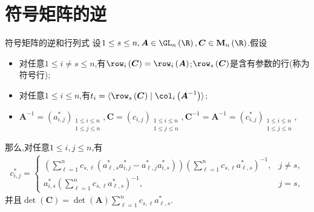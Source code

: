 \section{符号矩阵的逆}

\begin{theorem}{符号矩阵的逆和行列式}{}
	设$1\leq s\leq n,\boldsymbol{A}\in\GL_{n}\left(\R\right),\boldsymbol{C}\in\mathbf{M}_{n}\left(\R\right)$.假设
	\begin{itemize}
		\item 对任意$1\leq i\neq s\leq n$,有$\row_{i}\left(\boldsymbol{C}\right)=\row_{i}\left(\boldsymbol{A}\right)$;$\row_{s}\left(\boldsymbol{C}\right)$是含有参数的行(称为符号行);
		\item 对任意$1\leq i\leq n$,有$t_{i}=\langle\row_{s}\left(\boldsymbol{C}\right)\mid\col_{i}\left(\boldsymbol{A}^{-1}\right)\rangle$;
		\item $\boldsymbol{A}^{-1}=\left(a_{i,j}^{\ast}\right)_{\substack{1\leq i\leq n\\1\leq j\leq n}},\boldsymbol{C}=\left(c_{i,j}\right)_{\substack{1\leq i\leq n\\1\leq j\leq n}},\boldsymbol{C}^{-1}=\boldsymbol{A}^{-1}=\left(c_{i,j}^{\ast}\right)_{\substack{1\leq i\leq n\\1\leq j\leq n}}$,
	\end{itemize}
	那么,对任意$1\leq i,j\leq n$,有
	\begin{align*}
		c_{i,j}^{\ast}=
		\begin{cases}
			\left(\sum\limits_{\ell=1}^{n}c_{s,\ell}\left(a_{\ell,s}^{\ast}a_{i,j}^{\ast}-a_{\ell,j}^{\ast}a_{i,s}^{\ast}\right)\right)\left(\sum\limits_{\ell=1}^{n}c_{s,\ell}a_{\ell,s}^{\ast}\right)^{-1},&j\neq s,\\
			a_{i,s}^{\ast}\left(\sum\limits_{\ell=1}^{n}c_{s,\ell}a_{\ell,s}^{\ast}\right)^{-1},&j=s,
		\end{cases}
	\end{align*}
	并且$\det\left(\boldsymbol{C}\right)=\det\left(\boldsymbol{A}\right)\sum\limits_{\ell=1}^{n}c_{s,\ell}a_{\ell,s}^{\ast}$.
\end{theorem}